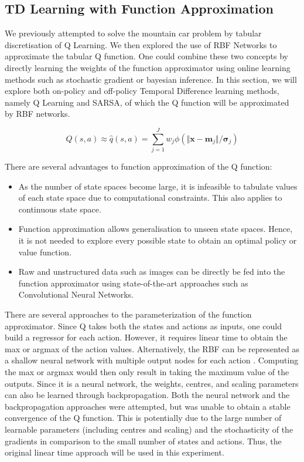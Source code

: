 \documentclass{article}
\begin{document}
\subsection{TD Learning with Function Approximation}

We previously attempted to solve the mountain car problem by tabular discretisation of Q Learning. We then explored the use of RBF Networks to approximate the tabular Q function. One could combine these two concepts by directly learning the weights of the function approximator using online learning methods such as stochastic gradient or bayesian inference. In this section, we will explore both on-policy and off-policy Temporal Difference learning methods, namely Q Learning and SARSA, of which the Q function will be approximated by RBF networks.

\begin{equation}
    Q(s, a) \approx \hat{q}(s, a) = \sum_{j = 1}^{J} w_j \phi(\Vert \pmb{x} - \pmb{m}_j \Vert / \pmb{\sigma}_j)
\end{equation}

There are several advantages to function approximation of the Q function:
\begin{itemize}
    \item As the number of state spaces become large, it is infeasible to tabulate values of each state space due to computational constraints. This also applies to continuous state space.
    \item Function approximation allows generalisation to unseen state spaces. Hence, it is not needed to explore every possible state to obtain an optimal policy or value function.
    \item Raw and unstructured data such as images can be directly be fed into the function approximator using state-of-the-art approaches such as Convolutional Neural Networks.
\end{itemize}

There are several approaches to the parameterization of the function approximator. Since Q takes both the states and actions as inputs, one could build a regressor for each action. However, it requires linear time to obtain the max or argmax of the action values. Alternatively, the RBF can be represented as a shallow neural network with multiple output nodes for each action \cite{mnihPlayingAtariDeep2013}. Computing the max or argmax would then only result in taking the maximum value of the outputs. Since it is a neural network, the weights, centres, and scaling parameters can also be learned through backpropagation. Both the neural network and the backpropagation approaches were attempted, but was unable to obtain a stable convergence of the Q function. This is potentially due to the large number of learnable parameters (including centres and scaling) and the stochasticity of the gradients in comparison to the small number of states and actions. Thus, the original linear time approach will be used in this experiment.
\end{document}
